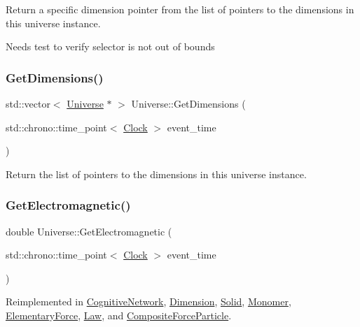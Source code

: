 Return a specific dimension pointer from the list of pointers to the dimensions in this universe instance.

Needs test to verify selector is not out of bounds\mbox{\label{classUniverse_a1869fc7bf43827378bab5a701f7f917a}} 
\subsubsection{\texorpdfstring{Get\+Dimensions()}{GetDimensions()}}
{\footnotesize\ttfamily std\+::vector$<$ \mbox{\hyperlink{classUniverse}{Universe}} $\ast$ $>$ Universe\+::\+Get\+Dimensions (\begin{DoxyParamCaption}\item[{std\+::chrono\+::time\+\_\+point$<$ \mbox{\hyperlink{universe_8h_a0ef8d951d1ca5ab3cfaf7ab4c7a6fd80}{Clock}} $>$}]{event\+\_\+time }\end{DoxyParamCaption})}

Return the list of pointers to the dimensions in this universe instance.\mbox{\label{classUniverse_a63b850ef3f3394313353109d222bf5d1}} 
\subsubsection{\texorpdfstring{Get\+Electromagnetic()}{GetElectromagnetic()}}
{\footnotesize\ttfamily double Universe\+::\+Get\+Electromagnetic (\begin{DoxyParamCaption}\item[{std\+::chrono\+::time\+\_\+point$<$ \mbox{\hyperlink{universe_8h_a0ef8d951d1ca5ab3cfaf7ab4c7a6fd80}{Clock}} $>$}]{event\+\_\+time }\end{DoxyParamCaption})\hspace{0.3cm}{\ttfamily [virtual]}}



Reimplemented in \mbox{\hyperlink{classCognitiveNetwork_a09e5a1c774c84529a7adfe56fadb7467}{Cognitive\+Network}}, \mbox{\hyperlink{classDimension_a21783c29a576518b722512f1245fa598}{Dimension}}, \mbox{\hyperlink{classSolid_a01cd3c441a4e339927c43536de6d9b5e}{Solid}}, \mbox{\hyperlink{classMonomer_ad23f4829d66cb20401cc72a9d72ac320}{Monomer}}, \mbox{\hyperlink{classElementaryForce_a2c8bc3226f42710717775c73eee1644e}{Elementary\+Force}}, \mbox{\hyperlink{classLaw_a01eba6e68d2d8a717e2b4789be90853d}{Law}}, and \mbox{\hyperlink{classCompositeForceParticle_a8ef336fed7e33d52a3baae4bd4dd32fd}{Composite\+Force\+Particle}}.

